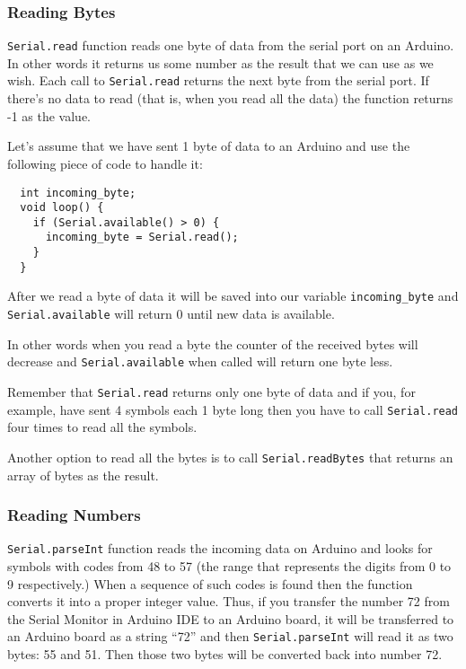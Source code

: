 \documentclass[../sparc.tex]{subfiles}
\begin{document}
\subsubsection{Reading Bytes}

\texttt{Serial.read} function reads one byte of data from the serial port on an
Arduino.  In other words it returns us some number as the result that we can use
as we wish.  Each call to \texttt{Serial.read} returns the next byte from the
serial port.  If there's no data to read (that is, when you read all the data)
the function returns -1 as the value.


Let's assume that we have sent 1 byte of data to an Arduino and use the
following piece of code to handle it:

\begin{verbatim}
  int incoming_byte;
  void loop() {
    if (Serial.available() > 0) {
      incoming_byte = Serial.read();
    }
  }
\end{verbatim}

After we read a byte of data it will be saved into our variable
\texttt{incoming\_byte} and \texttt{Serial.available} will return 0 until new
data is available.

In other words when you read a byte the counter of the received bytes will
decrease and \texttt{Serial.available} when called will return one byte less.

Remember that \texttt{Serial.read} returns only one byte of data and if you, for
example, have sent 4 symbols each 1 byte long then you have to call
\texttt{Serial.read} four times to read all the symbols.

Another option to read all the bytes is to call \texttt{Serial.readBytes} that
returns an array of bytes as the result.

\subsubsection{Reading Numbers}

\texttt{Serial.parseInt} function reads the incoming data on Arduino and looks
for symbols with codes from 48 to 57 (the range that represents the digits from
0 to 9 respectively.)  When a sequence of such codes is found then the function
converts it into a proper integer value.  Thus, if you transfer the number 72
from the Serial Monitor in Arduino IDE to an Arduino board, it will be
transferred to an Arduino board as a string ``72'' and then
\texttt{Serial.parseInt} will read it as two bytes: 55 and 51.  Then those two
bytes will be converted back into number 72.
\end{document}
